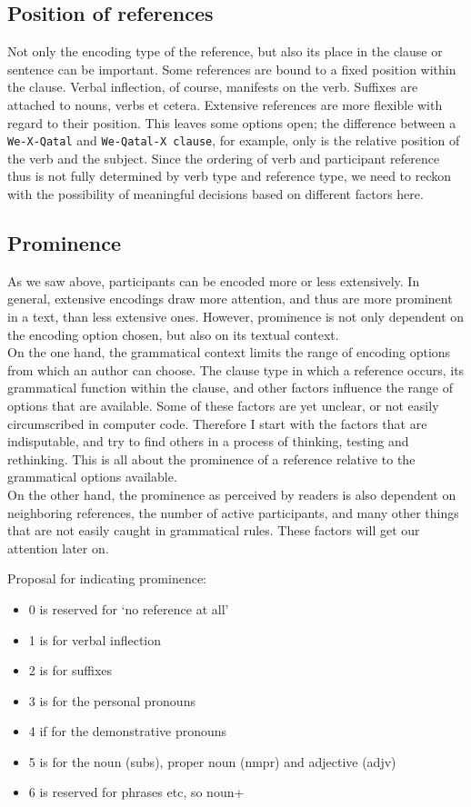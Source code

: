 \documentclass{report}
\newcommand{\mi}[1]{\lstinline{#1}}
\begin{document}
\subsection{Position of references}
Not only the encoding type of the reference, but also its place in the clause or sentence can be important. Some references are bound to a fixed position within the clause. Verbal inflection, of course, manifests on the verb. Suffixes are attached to nouns, verbs et cetera. Extensive references are more flexible with regard to their position. This leaves some options open; the difference between a \mi{We-X-Qatal} and \mi{We-Qatal-X clause}, for example, only is the relative position of the verb and the subject. Since the ordering of verb and participant reference thus is not fully determined by verb type and reference type, we need to reckon with the possibility of meaningful decisions based on different factors here.

\subsection{Prominence}
As we saw above, participants can be encoded more or less extensively. In general, extensive encodings draw more attention, and thus are more prominent in a text, than less extensive ones. However, prominence is not only dependent on the encoding option chosen, but also on its textual context.\\
On the one hand, the grammatical context limits the range of encoding options from which an author can choose. The clause type in which a reference occurs, its grammatical function within the clause, and other factors influence the range of options that are available. Some of these factors are yet unclear, or not easily circumscribed in computer code. Therefore I start with the factors that are indisputable, and try to find others in a process of thinking, testing and rethinking. This is all about the prominence of a reference relative to the grammatical options available.\\
On the other hand, the prominence as perceived by readers is also dependent on neighboring references, the number of active participants, and many other things that are not easily caught in grammatical rules. These factors will get our attention later on.

Proposal for indicating prominence:
\begin{itemize}
\item 0 is reserved for `no reference at all'
\item 1 is for verbal inflection
\item 2 is for suffixes
\item 3 is for the personal pronouns
\item 4 if for the demonstrative pronouns
\item 5 is for the noun (subs), proper noun (nmpr) and adjective (adjv)
\item 6 is reserved for phrases etc, so noun+
\end{itemize}
\end{document}
